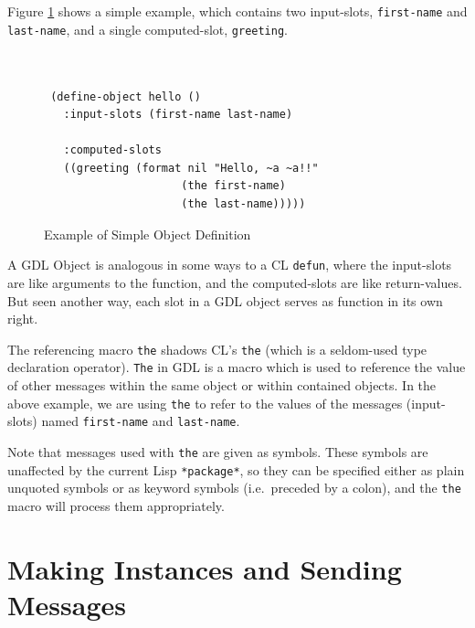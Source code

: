 \documentclass [11pt]{book}
\begin{document}
Figure 
\ref{fig:object-hello} shows a simple example, which contains two input-slots, \texttt{first-name} and \texttt{last-name}, and a single computed-slot, \texttt{greeting}.
\begin{figure}
\begin{lrbox}{\boxedverb}
\begin{minipage}{\linewidth}

\begin{verbatim}


 (define-object hello ()
   :input-slots (first-name last-name)

   :computed-slots 
   ((greeting (format nil "Hello, ~a ~a!!" 
                     (the first-name) 
                     (the last-name)))))

\end{verbatim}
\end{minipage}
\end{lrbox}
\fbox{\usebox{\boxedverb}}

\caption{Example of Simple Object Definition}

\label{fig:object-hello}

\end{figure}
A GDL Object is analogous in some ways to a CL \texttt{defun}, where the input-slots are like arguments to the function,
and the computed-slots are like return-values. But seen another way,
each slot in a GDL object serves as function in its own right.

The referencing macro \texttt{the} shadows CL's \texttt{the} (which is a seldom-used type declaration operator). \texttt{The} in GDL is a macro which is used to reference the value of other messages 
within the same object or within contained objects. In the above example, we are using \texttt{the} to refer to the values of the messages (input-slots) named \texttt{first-name} and \texttt{last-name}. 

Note that messages used with \texttt{the} are given as symbols. These symbols are unaffected by the current Lisp \texttt{*package*}, so they can be specified either as plain unquoted symbols or as keyword
symbols (i.e.\ preceded by a colon), and the \texttt{the} macro will process them appropriately.

\section{Making Instances and Sending Messages}

\label{sec:makinginstancesandsendingmessages}
\end{document}
